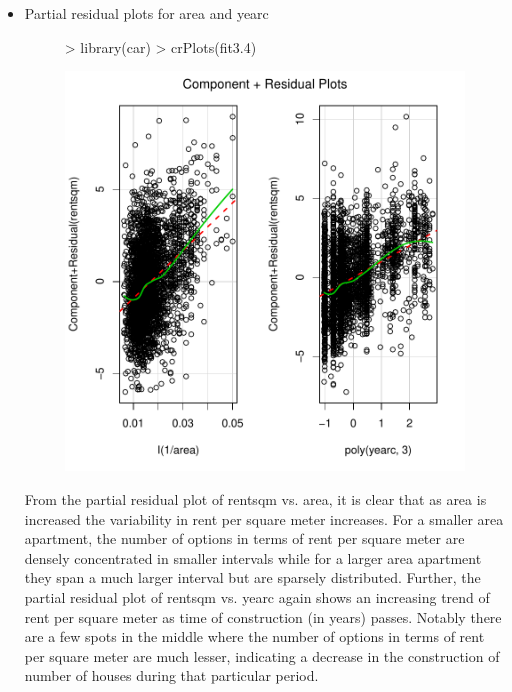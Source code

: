 \documentclass[12pt]{article}
\begin{document}
\begin{itemize}
\item Partial residual plots for area and yearc
\begin{figure}[H]
\begin{Schunk}
\begin{Sinput}
> library(car)
> crPlots(fit3.4)
\end{Sinput}
\end{Schunk}
\includegraphics{HW3-053}
\end{figure}
\clearpage

From the partial residual plot of rentsqm vs. area, it is clear that as area is increased the variability in rent per square meter increases. For a smaller area apartment, the number of options in terms of rent per square meter are densely concentrated in smaller intervals while for a larger area apartment they span a much larger interval but are sparsely distributed. Further, the partial residual plot of rentsqm vs. yearc again shows an increasing trend of rent per square meter as time of construction (in years) passes. Notably there are a few spots in the middle where the number of options in terms of rent per square meter are much lesser, indicating a decrease in the construction of number of houses during that particular period.  


\end{itemize}
\end{document}
